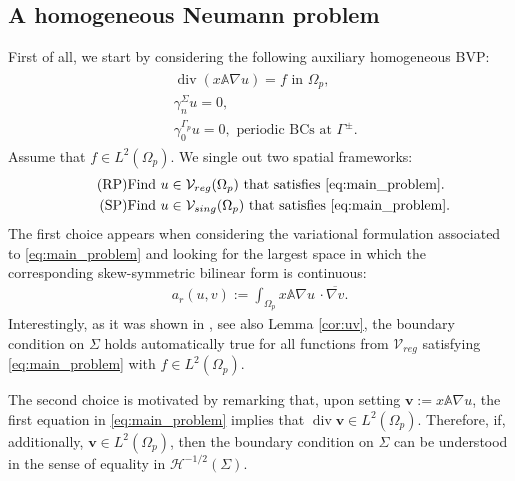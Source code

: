 \documentclass[report]{elsarticle}
\numberwithin{theorem}{section}
\begin{document}
\subsection{A homogeneous Neumann problem}
\label{sec:homog}
First of all, we start by considering the following auxiliary homogeneous BVP: 
\begin{align}
	\label{eq:main_problem}
	\begin{split}
		&\operatorname{div}( x \mathbb{A}\nabla u)=f \text{ in }\Omega_p, \\
		&\gamma_n^{\Sigma}u=0, \\ &\gamma_0^{\Gamma_p}u=0, \text{  periodic BCs at }\Gamma^{\pm}.
	\end{split}
\end{align}
Assume that $f\in L^2(\Omega_p)$. We single out two spatial frameworks:
\begin{align}
	\label{eq:rp}
	\tag{RP}
	&\text{Find }u\in \mathcal{V}_{reg}(\Omega_p) \text{ that satisfies }\eqref{eq:main_problem}.\\
	\label{eq:sp}
	\tag{SP}
	&\text{Find }u\in \mathcal{V}_{sing}(\Omega_p) \text{ that satisfies }\eqref{eq:main_problem}.   
\end{align}
The first choice appears when considering the variational formulation associated to \eqref{eq:main_problem} and looking for the largest space in which the corresponding skew-symmetric bilinear form is continuous: 
\begin{align*}
	a_{r}(u,v):=\int_{\Omega_p} x \mathbb{A} \nabla u\,\cdot \overline{\nabla v}.
\end{align*}
Interestingly, as it was shown in \cite[Section 1.1]{nicolopoulos}, see also Lemma \ref{cor:uv}, the boundary condition on $\Sigma$ holds automatically true for all functions from $\mathcal{V}_{reg}$ satisfying \eqref{eq:main_problem} with $f\in L^2(\Omega_p)$.  

The second choice is motivated by remarking that, upon setting $\boldsymbol{v}:= x \mathbb{A}\nabla u$, the first equation in \eqref{eq:main_problem} implies that $\operatorname{div}\boldsymbol{v}\in L^2(\Omega_p)$. Therefore, if, additionally, $\boldsymbol{v}\in L^2(\Omega_p)$, then the boundary condition on $\Sigma$ can be understood in the sense of equality in $\mathcal{H}^{-1/2}(\Sigma)$. 
%
\end{document}

